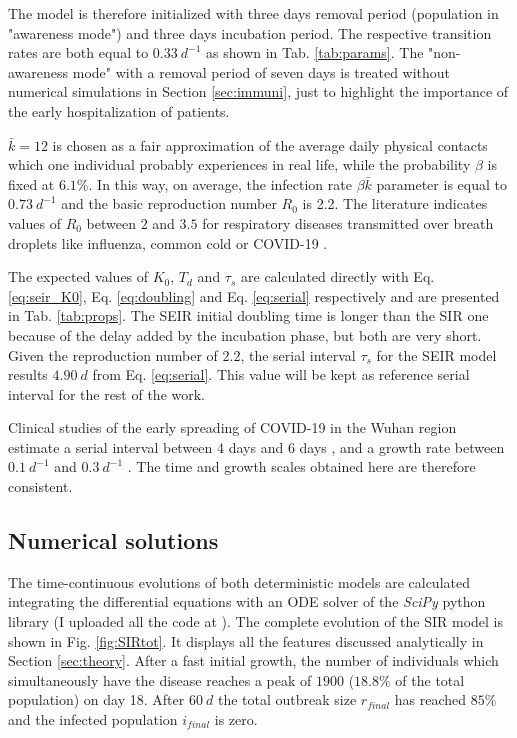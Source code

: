 \documentclass[DIV=12, BCOR=0pt]{scrartcl}  %
\begin{document}
  The model is therefore initialized with three days removal period (population in "awareness mode") and three days incubation period. 
  The respective transition rates are both equal to $0.33 \ d^{-1}$ as shown in Tab. \ref{tab:params}. 
  The "non-awareness mode" with a removal period of seven days is treated without numerical simulations in Section \ref{sec:immuni}, just to highlight the importance of the early hospitalization of patients. 
  
 
  $\bar{k} = 12$ is chosen as a fair approximation of the average daily physical contacts which one individual probably experiences in real life, while the probability $\beta$ is fixed at $6.1 \%$. In this way, on average, the infection rate $\beta \bar{k}$ parameter is equal to $0.73 \ d^{-1}$ and the basic reproduction number $R_0$ is 2.2. The literature indicates values of $R_0$ between $2$ and $3.5$ for respiratory diseases transmitted over breath droplets like influenza, common cold or COVID-19 \citep{Hilton2020, Sanche2020, Firth2020}.
  
  The expected values of $K_0$, $T_d$ and $\tau_s$ are calculated directly with Eq. \ref{eq:seir_K0}, Eq. \ref{eq:doubling} and Eq. \ref{eq:serial} respectively and are presented in Tab. \ref{tab:props}. The SEIR initial doubling time is longer than the SIR one because of the delay added by the incubation phase, but both are very short. Given the reproduction number of $2.2$, the serial interval $\tau_s$ for the SEIR model results $4.90 \ d$ from Eq. \ref{eq:serial}. This value will be kept as reference serial interval for the rest of the work.
  
  Clinical studies of the early spreading of COVID-19 in the Wuhan region estimate a serial interval between $4$ days \citep{Du2020} and $6$ days \citep{Firth2020}, and a growth rate between $0.1 \ d^{-1}$ \citep{Du2020} and $0.3 \ d^{-1}$ \citep{Sanche2020}. The time and growth scales obtained here are therefore consistent.
    
  
  \subsection{Numerical solutions}
	The time-continuous evolutions of both deterministic models are calculated integrating the differential equations with an ODE solver of the \textit{SciPy} python library (I uploaded all the code at \citet{pyndemic}). 	%
	The complete evolution of the SIR model is shown in Fig. \ref{fig:SIRtot}. It displays all the features discussed analytically in Section \ref{sec:theory}. After a fast initial growth, the number of individuals which simultaneously have the disease reaches a peak of $1900$ ($18.8 \%$ of the total population) on day 18. After $60 \ d$ the total outbreak size $r_{final}$ has reached $85 \%$ and the infected population $i_{final}$ is zero.
	
\end{document}
